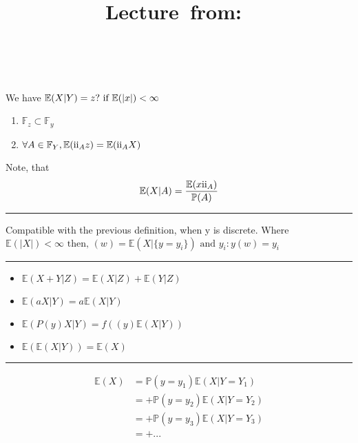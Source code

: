 \documentclass{article}
\title{
    \vspace{2in}
    \textmd{\textbf{\hmwkClass\ \hmwkTitle}}                                  \\
    \normalsize\vspace{0.1in}\small{Lecture\ from:\ \hmwkDueDate}             \\
    \vspace{0.1in}\large{\textit{\hmwkClassInstructor\ \hmwkClassTime}}
    \vspace{3in}
}
\author{\textbf{\hmwkAuthorName}}
\date{}
\newcommand{\RN}[1]{%
  \textup{\uppercase\expandafter{\romannumeral#1}}%
}
\begin{document}
\maketitle
    
\pagebreak
We have
$
\mathbb{E}(X|Y) = z?                                                          \\
\text{ if } 
\mathbb{E}(|x|) < \infty
$

\begin{enumerate}
\item $\mathbb{F}_{z} \subset \mathbb{F}_{y}$
\item $\forall A \in \mathbb{F}_{Y}, \mathbb{E}(\RN{2}_{A}z) = \mathbb{E}(\RN{2}_{A}X)$
\end{enumerate}
Note, that $$\mathbb{E}(X|A) = \dfrac{\mathbb{E}(x\RN{2}_{A})}{\mathbb{P}(A)}
$$

\noindent\rule{15cm}{0.4pt}%

Compatible with the previous definition, when y is discrete. Where 
$
\mathbb{E}(|X|) < \infty \text { then, } (w) = \mathbb{E}(X|\{y = y_{i}\}) 
\text{ and } y_{i} : y(w) = y_{i}
$

\noindent\rule{15cm}{0.4pt}%

\begin{itemize}
\item $ \mathbb{E}(X+Y|Z) = \mathbb{E}(X|Z) + \mathbb{E}(Y|Z)  $
\item $ \mathbb{E}(aX|Y) = a\mathbb{E}(X|Y)                    $
\item $ \mathbb{E}(P(y)X|Y) = f((y)\mathbb{E}(X|Y))            $
\item $ \mathbb{E}(\mathbb{E}(X|Y)) = \mathbb{E}(X)            $
\end{itemize}

\noindent\rule{15cm}{0.4pt}%

\begin{equation*}
  \begin{split}
    \mathbb{E}(X) &= \mathbb{P}(y = y_{1})\mathbb{E}(X|Y=Y_{1})               \\
                  &= + \mathbb{P}(y = y_{2})\mathbb{E}(X|Y=Y_{2})             \\
                  &= + \mathbb{P}(y = y_{3})\mathbb{E}(X|Y=Y_{3})             \\
                  &= + ...                                                    \\
  \end{split}
\end{equation*}
\end{document}
